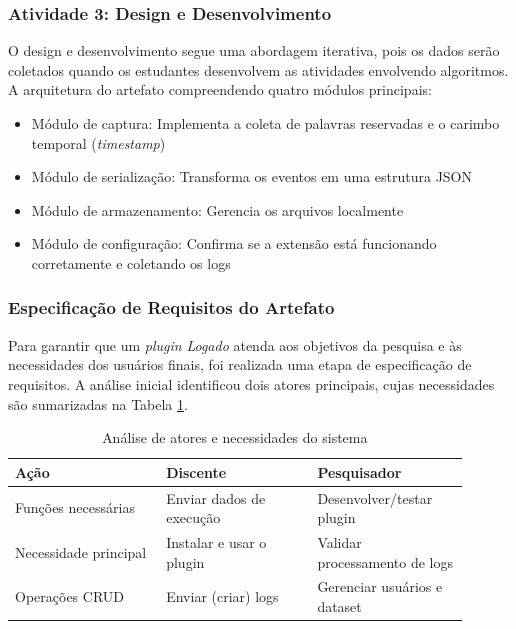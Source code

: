 \subsubsection{Atividade 3: Design e Desenvolvimento}
\label{subsubsec:design-desenvolvimento}

O design e desenvolvimento segue uma abordagem iterativa, pois os dados serão coletados quando os estudantes desenvolvem as atividades envolvendo algoritmos. A arquitetura do artefato compreendendo quatro módulos principais:

\begin{itemize}
\item Módulo de captura: Implementa a coleta de palavras reservadas e o carimbo temporal (\textit{timestamp})
\item Módulo de serialização: Transforma os eventos em uma estrutura JSON
\item Módulo de armazenamento: Gerencia os arquivos localmente
\item Módulo de configuração: Confirma se a extensão está funcionando corretamente e coletando os logs
\end{itemize}


\subsubsection{Especificação de Requisitos do Artefato}
\label{subsubsec:requisitos}

Para garantir que um \textit{plugin} \textit{Logado} atenda aos objetivos da pesquisa e às necessidades dos usuários finais, foi realizada uma etapa de especificação de requisitos. A análise inicial identificou dois atores principais, cujas necessidades são sumarizadas na Tabela \ref{tab:analise-atores}.

\begin{table}[h!]
\centering
\caption{Análise de atores e necessidades do sistema}
\label{tab:analise-atores}
\begin{tabular}{|p{0.3\linewidth}|p{0.3\linewidth}|p{0.3\linewidth}|}
\hline
\textbf{Ação} & \textbf{Discente} & \textbf{Pesquisador} \\
\hline
Funções necessárias & Enviar dados de execução & Desenvolver/testar plugin \\
\hline
Necessidade principal & Instalar e usar o plugin & Validar processamento de logs \\
\hline
Operações CRUD & Enviar (criar) logs & Gerenciar usuários e dataset \\
\hline
\end{tabular}
\end{table}

